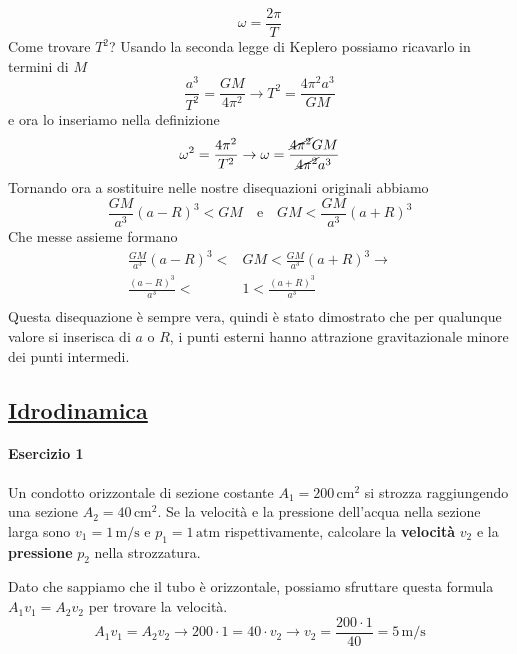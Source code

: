 \begin{equation*}
  \omega=\frac{2\pi}{T}
\end{equation*}
Come trovare $T^2$? Usando la seconda legge di Keplero possiamo ricavarlo in termini di $M$
\begin{equation*}
  \frac{a^3}{T^2} = \frac{GM}{4\pi^2} \rightarrow T^2 = \frac{4\pi^2a^3}{GM}
\end{equation*}
e ora lo inseriamo nella definizione
\begin{equation*}
  \omega^2=\frac{4\pi^2}{T^2} \rightarrow \omega=\frac{\cancel{4\pi^2}GM}{\cancel{4\pi^2}a^3}
\end{equation*}
Tornando ora a sostituire nelle nostre disequazioni originali abbiamo
\begin{equation*}
  \frac{GM}{a^3}(a-R)^3<GM\quad\text{e}\quad GM<\frac{GM}{a^3}(a+R)^3
\end{equation*}
Che messe assieme formano
\begin{align*}
  \frac{GM}{a^3}(a-R)^3<&GM<\frac{GM}{a^3}(a+R)^3\rightarrow\\
  \frac{(a-R)^3}{a^3}<&1<\frac{(a+R)^3}{a^3}\\
\end{align*}
Questa disequazione è sempre vera, quindi è stato dimostrato che per qualunque valore si inserisca di
$a$ o $R$, i punti esterni hanno attrazione gravitazionale minore dei punti intermedi.

\subsection*{\hyperref[sec:idrodinamica]{Idrodinamica}}\label{ex:idrodinamica}
\paragraph{Esercizio 1}
Un condotto orizzontale di sezione costante $A_1 = 200\,\text{cm}^2$ si strozza raggiungendo una 
sezione $A_2 = 40\,\text{cm}^2$. Se la velocità e la pressione dell'acqua nella sezione larga sono 
$v_1 = 1\,\text{m/s}$ e $p_1 = 1\,\text{atm}$ rispettivamente, calcolare la \textbf{velocità} $v_2$ e 
la \textbf{pressione} $p_2$ nella strozzatura.
\divisor

Dato che sappiamo che il tubo è orizzontale, possiamo sfruttare questa formula $A_1v_1=A_2v_2$ per
trovare la velocità.
\begin{equation*}
  A_1v_1 = A_2v_2 \rightarrow 200\cdot 1 = 40\cdot v_2 \rightarrow v_2 = \frac{200\cdot1}{40} = 
  \boxed{5\,\text{m/s}}
\end{equation*}

